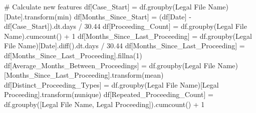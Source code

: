 \documentclass[
  letterpaper,
  DIV=11,
  numbers=noendperiod]{scrartcl}
\newenvironment{Shaded}{\begin{snugshade}}{\end{snugshade}}
\newcommand{\CommentTok}[1]{\textcolor[rgb]{0.37,0.37,0.37}{#1}}
\newcommand{\DecValTok}[1]{\textcolor[rgb]{0.68,0.00,0.00}{#1}}
\newcommand{\FloatTok}[1]{\textcolor[rgb]{0.68,0.00,0.00}{#1}}
\newcommand{\NormalTok}[1]{\textcolor[rgb]{0.00,0.23,0.31}{#1}}
\newcommand{\OperatorTok}[1]{\textcolor[rgb]{0.37,0.37,0.37}{#1}}
\newcommand{\StringTok}[1]{\textcolor[rgb]{0.13,0.47,0.30}{#1}}
\begin{document}
\begin{Shaded}
\begin{Highlighting}[]
\CommentTok{\# Calculate new features}
\NormalTok{df[}\StringTok{\textquotesingle{}Case\_Start\textquotesingle{}}\NormalTok{] }\OperatorTok{=}\NormalTok{ df.groupby(}\StringTok{\textquotesingle{}Legal File Name\textquotesingle{}}\NormalTok{)[}\StringTok{\textquotesingle{}Date\textquotesingle{}}\NormalTok{].transform(}\StringTok{\textquotesingle{}min\textquotesingle{}}\NormalTok{)}
\NormalTok{df[}\StringTok{\textquotesingle{}Months\_Since\_Start\textquotesingle{}}\NormalTok{] }\OperatorTok{=}\NormalTok{ (df[}\StringTok{\textquotesingle{}Date\textquotesingle{}}\NormalTok{] }\OperatorTok{{-}}\NormalTok{ df[}\StringTok{\textquotesingle{}Case\_Start\textquotesingle{}}\NormalTok{]).dt.days }\OperatorTok{/} \FloatTok{30.44}
\NormalTok{df[}\StringTok{\textquotesingle{}Proceeding\_Count\textquotesingle{}}\NormalTok{] }\OperatorTok{=}\NormalTok{ df.groupby(}\StringTok{\textquotesingle{}Legal File Name\textquotesingle{}}\NormalTok{).cumcount() }\OperatorTok{+} \DecValTok{1}
\NormalTok{df[}\StringTok{\textquotesingle{}Months\_Since\_Last\_Proceeding\textquotesingle{}}\NormalTok{] }\OperatorTok{=}\NormalTok{ df.groupby(}\StringTok{\textquotesingle{}Legal File Name\textquotesingle{}}\NormalTok{)[}\StringTok{\textquotesingle{}Date\textquotesingle{}}\NormalTok{].diff().dt.days }\OperatorTok{/} \FloatTok{30.44}
\NormalTok{df[}\StringTok{\textquotesingle{}Months\_Since\_Last\_Proceeding\textquotesingle{}}\NormalTok{] }\OperatorTok{=}\NormalTok{ df[}\StringTok{\textquotesingle{}Months\_Since\_Last\_Proceeding\textquotesingle{}}\NormalTok{].fillna(}\DecValTok{1}\NormalTok{)}
\NormalTok{df[}\StringTok{\textquotesingle{}Average\_Months\_Between\_Proceedings\textquotesingle{}}\NormalTok{] }\OperatorTok{=}\NormalTok{ df.groupby(}\StringTok{\textquotesingle{}Legal File Name\textquotesingle{}}\NormalTok{)[}\StringTok{\textquotesingle{}Months\_Since\_Last\_Proceeding\textquotesingle{}}\NormalTok{].transform(}\StringTok{\textquotesingle{}mean\textquotesingle{}}\NormalTok{)}
\NormalTok{df[}\StringTok{\textquotesingle{}Distinct\_Proceeding\_Types\textquotesingle{}}\NormalTok{] }\OperatorTok{=}\NormalTok{ df.groupby(}\StringTok{\textquotesingle{}Legal File Name\textquotesingle{}}\NormalTok{)[}\StringTok{\textquotesingle{}Legal Proceeding\textquotesingle{}}\NormalTok{].transform(}\StringTok{\textquotesingle{}nunique\textquotesingle{}}\NormalTok{)}
\NormalTok{df[}\StringTok{\textquotesingle{}Repeated\_Proceeding\_Count\textquotesingle{}}\NormalTok{] }\OperatorTok{=}\NormalTok{ df.groupby([}\StringTok{\textquotesingle{}Legal File Name\textquotesingle{}}\NormalTok{, }\StringTok{\textquotesingle{}Legal Proceeding\textquotesingle{}}\NormalTok{]).cumcount() }\OperatorTok{+} \DecValTok{1}

\end{Highlighting}
\end{Shaded}
\end{document}
